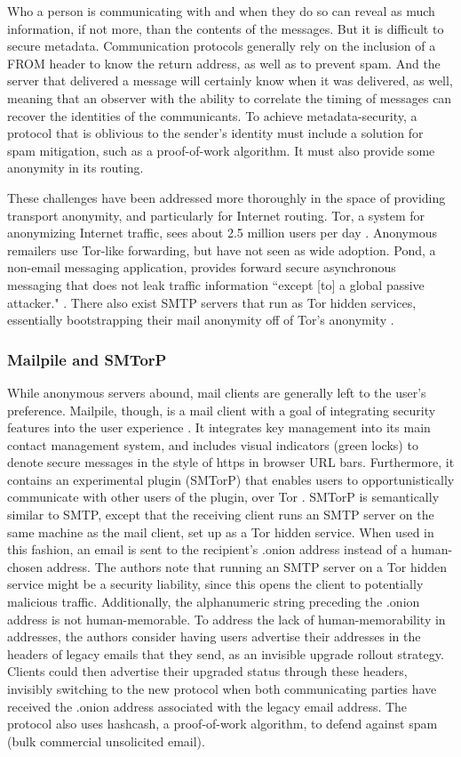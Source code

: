 \documentclass[pageno]{jpaper}
\begin{document}
Who a person is communicating with and when they do so can reveal as much information, if not more, than the contents of the messages. But it is difficult to secure metadata. Communication protocols generally rely on the inclusion of a FROM header to know the return address, as well as to prevent spam. And the server that delivered a message will certainly know when it was delivered, as well, meaning that an observer with the ability to correlate the timing of messages can recover the identities of the communicants. To achieve metadata-security, a protocol that is oblivious to the sender's identity must include a solution for spam mitigation, such as a proof-of-work algorithm. It must also provide some anonymity in its routing.

These challenges have been addressed more thoroughly in the space of providing transport anonymity, and particularly for Internet routing. Tor, a system for anonymizing Internet traffic, sees about 2.5 million users per day \cite{torusers}. Anonymous remailers use Tor-like forwarding, but have not seen as wide adoption. Pond, a non-email messaging application, provides forward secure asynchronous messaging that does not leak traffic information ``except [to] a global passive attacker." \cite{pond}. There also exist SMTP servers that run as Tor hidden services, essentially bootstrapping their mail anonymity off of Tor's anonymity \cite{onionmail}.


\subsubsection{Mailpile and SMTorP}
While anonymous servers abound, mail clients are generally left to the user's preference. Mailpile, though, is a mail client with a goal of integrating security features into the user experience \cite{mailpile}. It integrates key management into its main contact management system, and includes visual indicators (green locks) to denote secure messages in the style of https in browser URL bars. Furthermore, it contains an experimental plugin (SMTorP) that enables users to opportunistically communicate with other users of the plugin, over Tor \cite{smtorp}. SMTorP is semantically similar to SMTP, except that the receiving client runs an SMTP server on the same machine as the mail client, set up as a Tor hidden service. When used in this fashion, an email is sent to the recipient's .onion address instead of a human-chosen address. The authors note that running an SMTP server on a Tor hidden service might be a security liability, since this opens the client to potentially malicious traffic. Additionally, the alphanumeric string preceding the .onion address is not human-memorable. To address the lack of human-memorability in addresses, the authors consider having users advertise their addresses in the headers of legacy emails that they send, as an invisible upgrade rollout strategy. Clients could then advertise their upgraded status through these headers, invisibly switching to the new protocol when both communicating parties have received the .onion address associated with the legacy email address. The protocol also uses hashcash, a proof-of-work algorithm, to defend against spam (bulk commercial unsolicited email).
\end{document}
